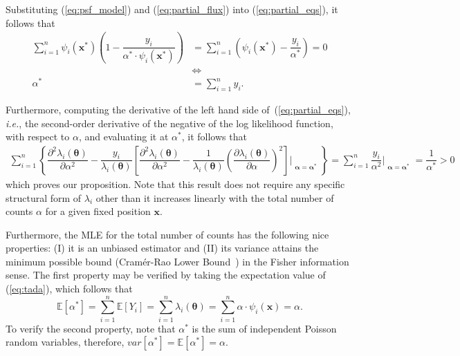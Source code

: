 \documentclass{rnaastex}
\begin{document}
Substituting (\ref{eq:psf_model}) and (\ref{eq:partial_flux}) into (\ref{eq:partial_eqs}), it follows that
\begin{align}
    \sum_{i=1}^{n} \psi_i(\bm{x}^{*})\left(1 - \dfrac{y_i}{\alpha^{*}\cdot\psi_i(\bm{x}^{*})} \right) &= \sum_{i=1}^{n} \left(\psi_i(\bm{x}^{*}) -  \dfrac{y_i}{\alpha^{*}}\right) = 0 \\
    & \Leftrightarrow \nonumber\\
    \alpha^{*} &= \sum_{i=1}^{n} y_i.
    \label{eq:tada}
\end{align}

Furthermore, computing the derivative of the left hand side of~(\ref{eq:partial_eqs}), \textit{i.e.}, the second-order derivative of the negative of the log likelihood function, with respect to $\alpha$, and evaluating it at $\alpha^{*}$, it follows that
\begin{align}
    \sum_{i=1}^{n}\left\{\dfrac{\partial^2 \lambda_i\left(\bm{\theta}\right)}{\partial \alpha^2}
    - \dfrac{y_i}{\lambda_i\left(\bm{\theta}\right)}\left[\dfrac{\partial^2 \lambda_i
    \left(\bm{\theta}\right)}{\partial \alpha^2} - \dfrac{1}{\lambda_i\left(\bm{\theta}\right)}
    \left(\dfrac{\partial \lambda_i\left(\bm{\theta}\right)}{\partial \alpha}\right)^2\right]\Bigr|_{\substack{\bm{\alpha}=\bm{\alpha}^{*}}}\right\} = \sum_{i=1}^{n}\dfrac{y_i}{\alpha^2}\Bigr|_{\substack{\bm{\alpha}=\bm{\alpha}^{*}}} = \dfrac{1}{\alpha^{*}} > 0
    \label{eq:partial2_eqs}
\end{align}
which proves our proposition. Note that this result does not require any specific structural form of $\lambda_i$ other than it increases linearly with the total number of counts $\alpha$ for a given fixed position $\bm{x}$.

Furthermore, the MLE for the total number of counts has the following nice properties: (\textrm{I}) it is an unbiased estimator and (\textrm{II}) its variance attains the minimum possible bound (Cram\'er-Rao Lower Bound~\citep{bobrovsky:1987}) in the Fisher information sense. The first property may be verified by taking the expectation value of (\ref{eq:tada}), which follows that
\begin{equation}
    \mathbb{E}\left[\alpha^{*}\right] = \sum_{i=1}^{n}\mathbb{E}[Y_i] = \sum_{i=1}^{n} \lambda_i(\bm{\theta}) = \sum_{i=1}^{n} \alpha\cdot\psi_i(\bm{x}) = \alpha.
\end{equation}
To verify the second property, note that $\alpha^{*}$ is the sum of independent Poisson random variables, therefore, $var\left[\alpha^{*}\right] = \mathbb{E}\left[\alpha^{*}\right] = \alpha$.
\end{document}
